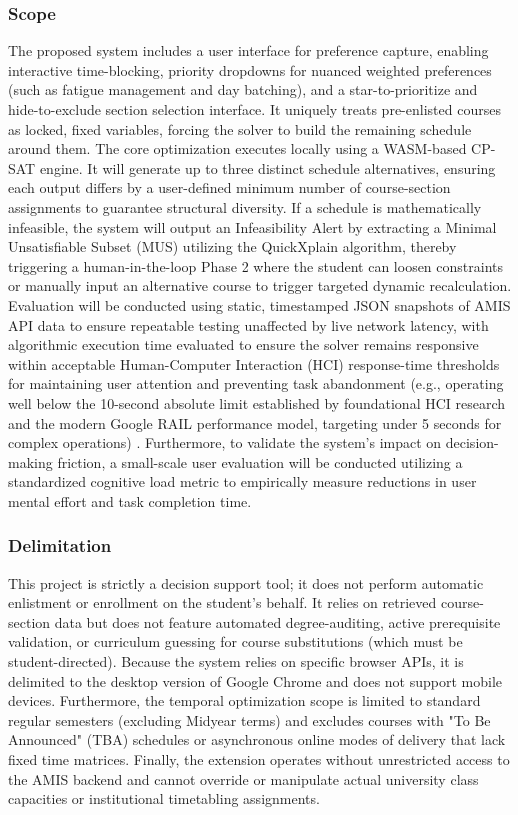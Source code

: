 \documentclass{icsthesis}
\begin{document}
\begin{mainmatter}
		\subsubsection{Scope}
		The proposed system includes a user interface for preference capture, enabling interactive time-blocking, priority dropdowns for nuanced weighted preferences (such as fatigue management and day batching), and a star-to-prioritize and hide-to-exclude section selection interface. It uniquely treats pre-enlisted courses as locked, fixed variables, forcing the solver to build the remaining schedule around them. The core optimization executes locally using a WASM-based CP-SAT engine. It will generate up to three distinct schedule alternatives, ensuring each output differs by a user-defined minimum number of course-section assignments to guarantee structural diversity. If a schedule is mathematically infeasible, the system will output an Infeasibility Alert by extracting a Minimal Unsatisfiable Subset (MUS) utilizing the QuickXplain algorithm, thereby triggering a human-in-the-loop Phase 2 where the student can loosen constraints or manually input an alternative course to trigger targeted dynamic recalculation. Evaluation will be conducted using static, timestamped JSON snapshots of AMIS API data to ensure repeatable testing unaffected by live network latency, with algorithmic execution time evaluated to ensure the solver remains responsive within acceptable Human-Computer Interaction (HCI) response-time thresholds for maintaining user attention and preventing task abandonment (e.g., operating well below the 10-second absolute limit established by foundational HCI research and the modern Google RAIL performance model, targeting under 5 seconds for complex operations) \citep{miller1968, nielsen1993, googlerail2020}. Furthermore, to validate the system's impact on decision-\\making friction, a small-scale user evaluation will be conducted utilizing a standardized cognitive load metric to empirically measure reductions in user mental effort and task completion time.
		
		\subsubsection{Delimitation}
		This project is strictly a decision support tool; it does not perform automatic enlistment or enrollment on the student's behalf. It relies on retrieved course-section data but does not feature automated degree-auditing, active prerequisite validation, or curriculum guessing for course substitutions (which must be student-directed). Because the system relies on specific browser APIs, it is delimited to the desktop version of Google Chrome and does not support mobile devices. Furthermore, the temporal optimization scope is limited to standard regular semesters (excluding Midyear terms) and excludes courses with "To Be Announced" (TBA) schedules or asynchronous online modes of delivery that lack fixed time matrices. Finally, the extension operates without unrestricted access to the AMIS backend and cannot override or manipulate actual university class capacities or institutional timetabling assignments.
		

\end{mainmatter}
\end{document}
